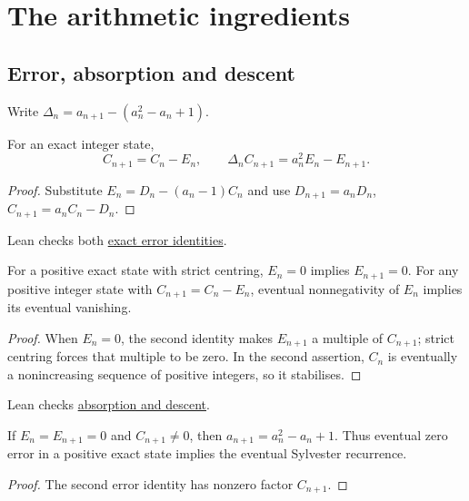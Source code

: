 \documentclass[11pt]{article}
\begin{document}
\section{The arithmetic ingredients}\label{sec:state}
\subsection{Error, absorption and descent}\label{sec:defect}\label{sec:descent}
Write $\Delta_n=a_{n+1}-(a_n^2-a_n+1)$.

\begin{proposition}\label{res:update}\label{res:defect}
For an exact integer state,
\[
 C_{n+1}=C_n-E_n,\qquad
 \Delta_n C_{n+1}=a_n^2E_n-E_{n+1}.
\]
\end{proposition}
\begin{proof}
Substitute $E_n=D_n-(a_n-1)C_n$ and use
$D_{n+1}=a_nD_n$, $C_{n+1}=a_nC_n-D_n$.
\end{proof}

\noindent Lean checks both \href{https://github.com/wcook04/plectis-erdos/blob/f36a98bf3d3e6f65f1074e3b800e3293d5b8a51a/ErdosProblems/Erdos243/PaperCompleteR7/Arithmetic.lean#L21}{exact error identities}.

\begin{theorem}\label{res:absorb}\label{res:descent}
For a positive exact state with strict centring, $E_n=0$ implies
$E_{n+1}=0$. For any positive integer state with $C_{n+1}=C_n-E_n$,
eventual nonnegativity of $E_n$ implies its eventual vanishing.
\end{theorem}
\begin{proof}
When $E_n=0$, the second identity makes $E_{n+1}$ a multiple of
$C_{n+1}$; strict centring forces that multiple to be zero. In the second
assertion, $C_n$ is eventually a nonincreasing sequence of positive
integers, so it stabilises.
\end{proof}

\noindent Lean checks \href{https://github.com/wcook04/plectis-erdos/blob/f36a98bf3d3e6f65f1074e3b800e3293d5b8a51a/ErdosProblems/Erdos243/PaperCompleteR7/Arithmetic.lean#L120}{absorption and descent}.

\begin{corollary}\label{res:step}\label{res:eventual}
If $E_n=E_{n+1}=0$ and $C_{n+1}\ne0$, then
$a_{n+1}=a_n^2-a_n+1$. Thus eventual zero error in a positive exact state
implies the eventual Sylvester recurrence.
\end{corollary}
\begin{proof}
The second error identity has nonzero factor $C_{n+1}$.
\end{proof}
\end{document}
